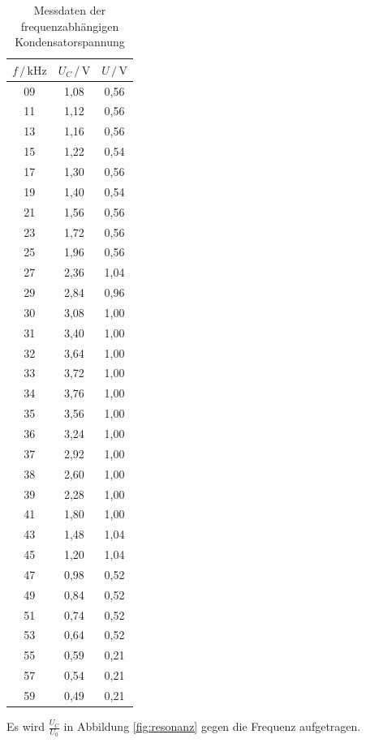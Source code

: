 \begin{table}
  \centering
  \caption{Messdaten der frequenzabhängigen Kondensatorspannung}
  \label{tab:Messdaten2}
  \begin{tabular}{c c c}
  \toprule
  $f \,/\, \si{\kilo\hertz}$ & $U_C \,/\, \si{\volt}$ & $U \,/\, \si{\volt}$ \\
  \midrule
  09 & 1,08 & 0,56\\
  11 & 1,12 & 0,56\\
  13 & 1,16 & 0,56\\
  15 & 1,22 & 0,54\\
  17 & 1,30 & 0,56\\
  19 & 1,40 & 0,54\\
  21 & 1,56 & 0,56\\
  23 & 1,72 & 0,56\\
  25 & 1,96 & 0,56\\
  27 & 2,36 & 1,04\\
  29 & 2,84 & 0,96\\
  30 & 3,08 & 1,00\\
  31 & 3,40 & 1,00\\
  32 & 3,64 & 1,00\\
  33 & 3,72 & 1,00\\
  34 & 3,76 & 1,00\\
  35 & 3,56 & 1,00\\
  36 & 3,24 & 1,00\\
  37 & 2,92 & 1,00\\
  38 & 2,60 & 1,00\\
  39 & 2,28 & 1,00\\
  41 & 1,80 & 1,00\\
  43 & 1,48 & 1,04\\
  45 & 1,20 & 1,04\\
  47 & 0,98 & 0,52\\
  49 & 0,84 & 0,52\\
  51 & 0,74 & 0,52\\
  53 & 0,64 & 0,52\\
  55 & 0,59 & 0,21\\
  57 & 0,54 & 0,21\\
  59 & 0,49 & 0,21\\
  \bottomrule
  \end{tabular}
  \end{table} 

Es wird $\frac{U_C}{U_0}$ in Abbildung \ref{fig:resonanz} gegen die Frequenz aufgetragen. 

